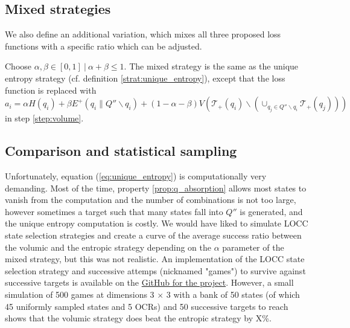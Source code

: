 


\subsection{Mixed strategies}

We also define an additional variation, which mixes all three proposed loss functions with a specific ratio which can be adjusted.

\begin{definition}
    Choose $\alpha, \beta \in [0, 1] \: | \: \alpha + \beta \leq 1$. The mixed strategy is the same as the unique entropy strategy (cf. definition \ref{strat:unique_entropy}), except that the loss function is replaced with $a_i = \alpha H(q_i) + \beta E^+(q_i \parallel Q'' \backslash q_i) + (1 - \alpha - \beta) V\left(\mathcal{T}_+(q_i) \backslash \left(\cup_{q_j \in Q'' \backslash q_i} \mathcal{T}_+(q_j)\right)\right)$ in step \ref{step:volume}.
\end{definition}



\subsection{Comparison and statistical sampling}

Unfortunately, equation (\ref{eq:unique_entropy}) is computationally very demanding. Most of the time, property \ref{prop:q_absorption} allows most states to vanish from the computation and the number of combinations is not too large, however sometimes a target such that many states fall into $Q''$ is generated, and the unique entropy computation is costly. We would have liked to simulate LOCC state selection strategies and create a curve of the average success ratio between the volumic and the entropic strategy depending on the $\alpha$ parameter of the mixed strategy, but this was not realistic. An implementation of the LOCC state selection strategy and successive attemps (nicknamed "games") to survive against successive targets is available on the \href{https://github.com/traaldbjerg/MajoLat}{GitHub for the project}. However, a small simulation of 500 games at dimensions 3 $\times$ 3 with a bank of 50 states (of which 45 uniformly sampled states and 5 OCRs) and 50 successive targets to reach shows that the volumic strategy does beat the entropic strategy by X\%.



